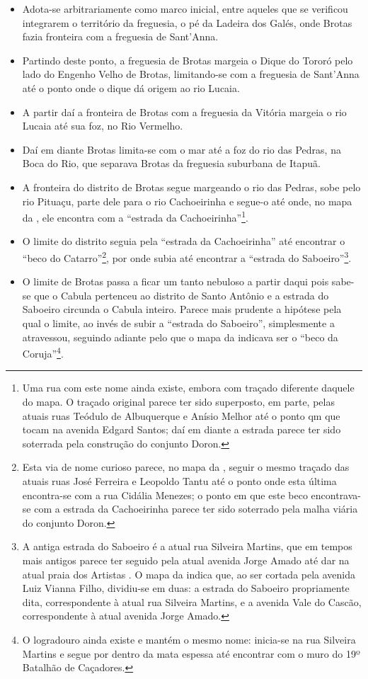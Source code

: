 \begin{itemize}
\item Adota-se arbitrariamente como marco inicial, entre aqueles que se verificou integrarem o território da freguesia, o pé da Ladeira dos Galés, onde Brotas fazia fronteira com a freguesia de Sant'Anna.
\item Partindo deste ponto, a freguesia de Brotas margeia o Dique do Tororó pelo lado do Engenho Velho de Brotas, limitando-se com a freguesia de Sant'Anna até o ponto onde o dique dá origem ao rio Lucaia.
\item A partir daí a fronteira de Brotas com a freguesia da Vitória margeia o rio Lucaia até sua foz, no Rio Vermelho.
\item Daí em diante Brotas limita-se com o mar até a foz do rio das Pedras, na Boca do Rio, que separava Brotas da freguesia suburbana de Itapuã.
\item A fronteira do distrito de Brotas segue margeando o rio das Pedras, sobe pelo rio Pituaçu, parte dele para o rio Cachoeirinha e segue-o até onde, no mapa da , ele encontra com a ``estrada da Cachoeirinha''\footnote{Uma rua com este nome ainda existe, embora com traçado diferente daquele do mapa. O traçado original parece ter sido superposto, em parte, pelas atuais ruas Teódulo de Albuquerque e Anísio Melhor até o ponto qm que tocam na avenida Edgard Santos; daí em diante a estrada parece ter sido soterrada pela construção do conjunto Doron.}.
\item O limite do distrito seguia pela ``estrada da Cachoeirinha'' até encontrar o ``beco do Catarro''\footnote{Esta via de nome curioso parece, no mapa da , seguir o mesmo traçado das atuais ruas José Ferreira e Leopoldo Tantu até o ponto onde esta última encontra-se com a rua Cidália Menezes; o ponto em que este beco encontrava-se com a estrada da Cachoeirinha parece ter sido soterrado pela malha viária do conjunto Doron.}, por onde subia até encontrar a ``estrada do Saboeiro''\footnote{A antiga estrada do Saboeiro é a atual rua Silveira Martins, que em tempos mais antigos parece ter seguido pela atual avenida Jorge Amado até dar na atual praia dos Artistas \cite{souza_guia_1935}. O mapa da  indica que, ao ser cortada pela avenida Luiz Vianna Filho, dividiu-se em duas: a estrada do Saboeiro propriamente dita, correspondente à atual rua Silveira Martins, e a avenida Vale do Cascão, correspondente à atual avenida Jorge Amado.}.
\item O limite de Brotas passa a ficar um tanto nebuloso a partir daqui  pois sabe-se que o Cabula pertenceu ao distrito de Santo Antônio e a estrada do Saboeiro circunda o Cabula inteiro. Parece mais prudente a hipótese pela qual o limite, ao invés de subir a ``estrada do Saboeiro'', simplesmente a atravessou, seguindo adiante pelo que o mapa da  indicava ser o ``beco da Coruja''\footnote{O logradouro ainda existe e mantém o mesmo nome: inicia-se na rua Silveira Martins e segue por dentro da mata espessa até encontrar com o muro do 19º Batalhão de Caçadores.}.

\end{itemize}
